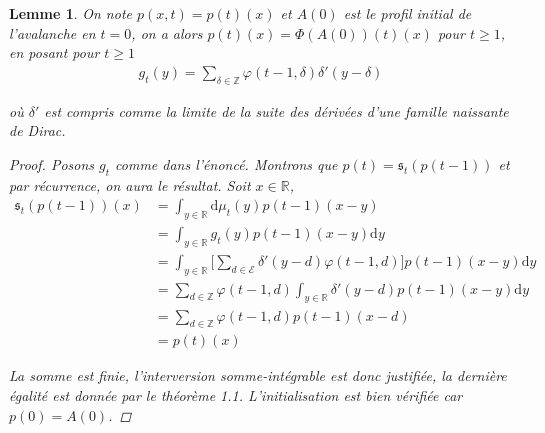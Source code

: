 \documentclass{article}
\newtheorem{lemma}[theorem]{Lemme}
\theoremstyle{definition}
\begin{document}
\begin{lemma}
	On note $p(x,t) = p(t)(x)$ et  $A(0)$ est le profil initial de l'avalanche en $t=0$, on a alors $p(t)(x) = \Phi(A(0))(t)(x)$ pour $t\geq 1$, en posant pour $t\geq 1$
	\begin{align*}
		g_t(y) = \sum_{\delta \in \mathbb{Z}}\varphi(t-1,\delta)\delta'(y-\delta)
	\end{align*}

	où $\delta'$ est compris comme la limite de la suite des dérivées d'une famille naissante de Dirac. 
	\begin{proof}
		Posons $g_t$ comme dans l'énoncé. Montrons que $p(t) = \mathfrak{s}_t(p(t-1))$ et par récurrence, on aura le résultat. Soit $x\in\mathbb{R}$,  
		\begin{align*}
			\mathfrak{s}_t(p(t-1))(x) &= \int_{y\in\mathbb{R}}\mathrm{d}\mu_t(y)p(t-1)(x-y)\\
						  &= \int_{y\in\mathbb{R}} g_t(y)p(t-1)(x-y)\mathrm{d}y\\
						  &= \int_{y\in\mathbb{R}} \bigg [\sum_{d\in \mathcal{E}}\delta'(y-d)\varphi(t-1,d)\bigg]p(t-1)(x-y)\mathrm{d}y\\
						  &= \sum_{d\in\mathbb{Z}}\varphi(t-1,d) \int_{y\in\mathbb{R}}\delta'(y-d) p(t-1)(x-y)\mathrm{d}y\\
						  &= \sum_{d\in\mathbb{Z}}\varphi(t-1,d) p(t-1)(x-d) \\
						  &= p(t)(x)
		\end{align*}

		La somme est finie, l'interversion somme-intégrable est donc justifiée, la dernière égalité est donnée par le théorème 1.1. L'initialisation est bien vérifiée car $p(0) = A(0)$.

	\end{proof}
\end{lemma}
\end{document}
